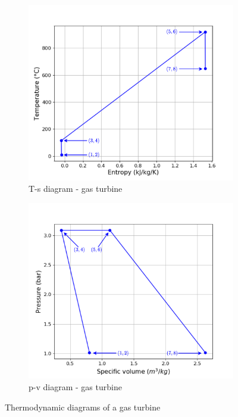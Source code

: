 \begin{figure}[H]
     \centering
     \begin{subfigure}[b]{0.4\textwidth}
         \centering
         \includegraphics[width=\textwidth]{Ts_GT}
         \caption{T-s diagram - gas turbine}
         \label{fig:C5_Ts_GT}
     \end{subfigure}
     \begin{subfigure}[b]{0.4\textwidth}
         \centering
         \includegraphics[width=\textwidth]{pv_GT}
         \caption{p-v diagram - gas turbine}
         \label{fig:C5_pv_GT}
     \end{subfigure}
        \caption{Thermodynamic diagrams of a gas turbine}
        \label{fig:C5_thermo_diagram_GT}
\end{figure}

